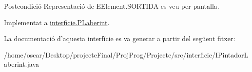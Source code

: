 \begin{DoxyPostcond}{Postcondició}
Representació de E\+Element.\+S\+O\+R\+T\+I\+D\+A es veu per pantalla. 
\end{DoxyPostcond}


Implementat a \hyperlink{classinterficie_1_1_p_laberint_adc6caa1f1d91892ea56077d2facac8ec}{interficie.\+P\+Laberint}.



La documentació d'aquesta interfície es va generar a partir del següent fitxer\+:\begin{DoxyCompactItemize}
\item 
/home/oscar/\+Desktop/projecte\+Final/\+Proj\+Prog/\+Projecte/src/interficie/I\+Pintador\+Laberint.\+java\end{DoxyCompactItemize}
